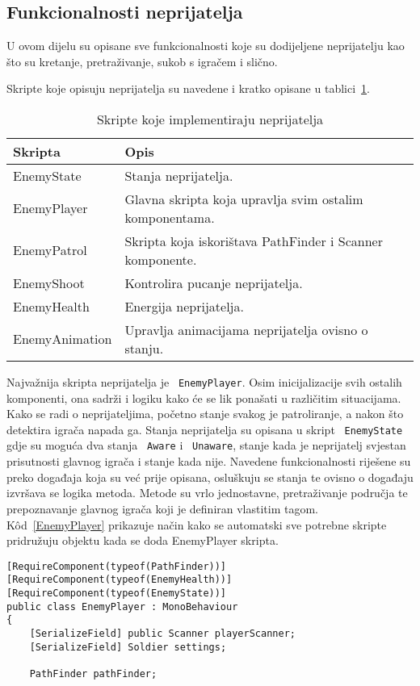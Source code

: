 \subsection{Funkcionalnosti neprijatelja}
U ovom dijelu su opisane sve funkcionalnosti koje su dodijeljene neprijatelju kao
što su kretanje, pretraživanje, sukob s igračem i slično.

Skripte koje opisuju neprijatelja su navedene i kratko opisane u
tablici~\ref{fig:EnemyTable}.
\begin{table}
\begin{tabularx}{0.9\textwidth}{lX}
\hline
Skripta&Opis \\
\hline
EnemyState&Stanja neprijatelja. \\
EnemyPlayer&Glavna skripta koja upravlja svim ostalim komponentama.\\
EnemyPatrol&Skripta koja iskorištava PathFinder i Scanner komponente.\\
EnemyShoot&Kontrolira pucanje neprijatelja. \\
EnemyHealth&Energija neprijatelja. \\
EnemyAnimation&Upravlja animacijama neprijatelja ovisno o stanju. \\
\hline
\end{tabularx}
\caption{Skripte koje implementiraju neprijatelja}\label{fig:EnemyTable}
\end{table}
Najvažnija skripta neprijatelja je ~\texttt{EnemyPlayer}. Osim inicijalizacije svih ostalih
komponenti, ona sadrži i logiku kako će se lik ponašati u različitim situacijama.
Kako se radi o neprijateljima, početno stanje svakog je patroliranje, a nakon što
detektira igrača napada ga. Stanja neprijatelja su opisana u skript ~\texttt{EnemyState} gdje
su moguća dva stanja ~\texttt{Aware} i ~\texttt{Unaware}, stanje kada je neprijatelj svjestan
prisutnosti glavnog igrača i stanje kada nije. Navedene funkcionalnosti riješene su
preko događaja koja su već prije opisana, osluškuju se stanja te ovisno o događaju
izvršava se logika metoda. Metode su vrlo jednostavne, pretraživanje područja te
prepoznavanje glavnog igrača koji je definiran vlastitim tagom.
K\^od~\ref{EnemyPlayer} prikazuje način kako se automatski sve potrebne skripte
pridružuju objektu kada se doda EnemyPlayer skripta.
\begin{lstlisting}[caption={Automatsko pridruživanje ovisnih skripti},
label=EnemyPlayer]
[RequireComponent(typeof(PathFinder))]
[RequireComponent(typeof(EnemyHealth))]
[RequireComponent(typeof(EnemyState))]
public class EnemyPlayer : MonoBehaviour
{
    [SerializeField] public Scanner playerScanner;
    [SerializeField] Soldier settings;

    PathFinder pathFinder;
\end{lstlisting}
